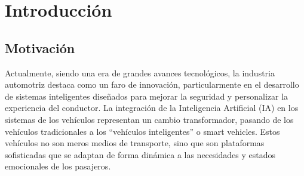 \documentclass[12pt]{report} %
\begin{document}



\chapter{Introducción}

\section{Motivación}

Actualmente, siendo una era de grandes avances tecnológicos, la industria automotriz destaca como un faro de innovación, particularmente en el desarrollo de sistemas inteligentes diseñados para mejorar la seguridad y personalizar la experiencia del conductor. La integración de la Inteligencia Artificial (IA) en los sistemas de los vehículos representan un cambio transformador, pasando de los vehículos tradicionales a los “vehículos inteligentes” o smart vehicles. Estos vehículos no son meros medios de transporte, sino que son plataformas sofisticadas que se adaptan de forma dinámica a las necesidades y estados emocionales de los pasajeros. 
\end{document}
